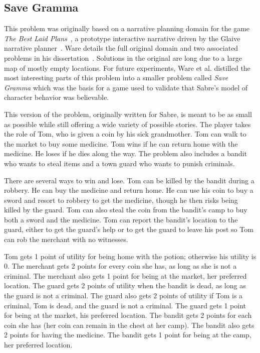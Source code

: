 \documentclass{nilreport}
\makeatletter
\renewcommand{\bibentry}[1]{\nocite{#1}{\frenchspacing\@nameuse{BR@r@#1\@extra@b@citeb}}}
\makeatother
\begin{document}
\subsection{Save Gramma}

This problem was originally based on a narrative planning domain for
the game \emph{The Best Laid Plans}~\cite{ware2015blp}, a prototype
interactive narrative driven by the Glaive narrative planner~\cite{ware2014glaive}.
Ware details the full original domain and two associated problems
in his dissertation~\cite{ware2014thesis}. Solutions in the original
are long due to a large map of mostly empty locations. For future
experiments, Ware et al. distilled the most interesting parts of this
problem into a smaller problem called \emph{Save Gramma} which was
the basis for a game used to validate that Sabre's model of character
behavior was believable.

\begin{quote}
	\bibentry{ware2022multi}
\end{quote}

\noindent This version of the problem, originally written for Sabre,
is meant to be as small as possible while still offering a wide variety
of possible stories. The player takes the role of Tom, who is given
a coin by his sick grandmother. Tom can walk to the market to buy
some medicine. Tom wins if he can return home with the medicine. He
loses if he dies along the way. The problem also includes a bandit
who wants to steal items and a town guard who wants to punish criminals.

There are several ways to win and lose. Tom can be killed by the bandit
during a robbery. He can buy the medicine and return home. He can
use his coin to buy a sword and resort to robbery to get the medicine,
though he then risks being killed by the guard. Tom can also steal
the coin from the bandit's camp to buy both a sword and the medicine.
Tom can report the bandit's location to the guard, either to get the
guard's help or to get the guard to leave his post so Tom can rob
the merchant with no witnesses.

Tom gets 1 point of utility for being home with the potion; otherwise
his utility is 0. The merchant gets 2 points for every coin she has,
as long as she is not a criminal. The merchant also gets 1 point for
being at the market, her preferred location. The guard gets 2 points
of utility when the bandit is dead, as long as the guard is not a
criminal. The guard also gets 2 points of utility if Tom is a criminal,
Tom is dead, and the guard is not a criminal. The guard gets 1 point
for being at the market, his preferred location. The bandit gets 2
points for each coin she has (her coin can remain in the chest at
her camp). The bandit also gets 2 points for having the medicine.
The bandit gets 1 point for being at the camp, her preferred location.
\end{document}
